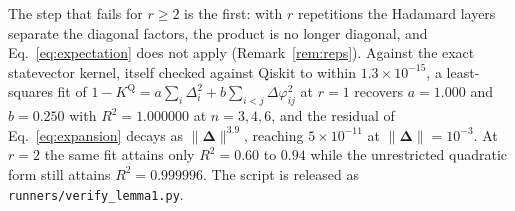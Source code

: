 \begin{revbody}
The step that fails for $r\ge2$ is the first: with $r$ repetitions the
Hadamard layers separate the diagonal factors, the product is no longer
diagonal, and Eq.~\eqref{eq:expectation} does not apply
(Remark~\ref{rem:reps}). Against the exact statevector kernel, itself checked
against Qiskit to within $1.3\times10^{-15}$, a least-squares fit of
$1-K^{\mathrm{Q}} = a\sum_i\Delta_i^2 + b\sum_{i<j}\Delta\varphi_{ij}^2$ at
$r=1$ recovers $a=1.000$ and $b=0.250$ with $R^{2}=1.000000$ at $n=3,4,6$, and
the residual of Eq.~\eqref{eq:expansion} decays as $\|\bm{\Delta}\|^{3.9}$,
reaching $5\times10^{-11}$ at $\|\bm{\Delta}\|=10^{-3}$. At $r=2$ the same fit
attains only $R^{2}=0.60$ to $0.94$ while the unrestricted quadratic form still
attains $R^{2}=0.999996$. The script is released as
\texttt{runners/verify\_lemma1.py}.
\end{revbody}
